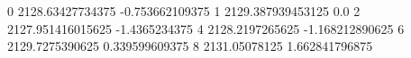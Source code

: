 0 2128.63427734375 -0.753662109375
1 2129.387939453125 0.0
2 2127.951416015625 -1.4365234375
4 2128.2197265625 -1.168212890625
6 2129.7275390625 0.339599609375
8 2131.05078125 1.662841796875
